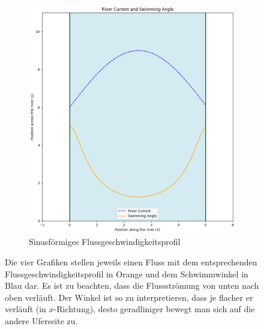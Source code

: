 \begin{figure}
\begin{subfigure}{0.48\textwidth}
        \includegraphics[width=\textwidth]{papers/schwimmen/Grafiken/sin-crop.png}	
        \caption{Sinusförmiges Flussgeschwindigkeitsprofil}
        \label{fig:sin_velocity}
    \end{subfigure}
    \par\bigskip
    \caption{Die vier Grafiken stellen jeweils einen Fluss mit dem entsprechenden Flussgeschwindigkeitsprofil in Orange und dem Schwimmwinkel in Blau dar. Es ist zu beachten, dass die Flussströmung von unten nach oben verläuft. Der Winkel ist so zu interpretieren, dass je flacher er verläuft (in \(x\)-Richtung), desto geradliniger bewegt man sich auf die andere Uferseite zu.}
    \label{fig:river_pfrofiles}
\end{figure}




















